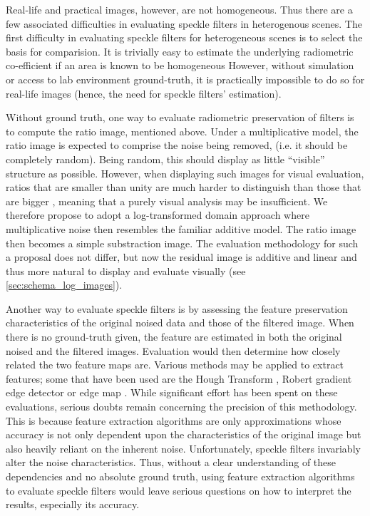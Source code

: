 \documentclass[journal]{IEEEtran}
\begin{document}
Real-life and practical images, however, are not homogeneous.
Thus there are a few associated difficulties in evaluating speckle filters in heterogenous scenes.
The first difficulty in evaluating speckle filters for heterogeneous scenes is to select the basis for comparision. 
It is trivially easy to estimate the underlying radiometric co-efficient if an area is known to be homogeneous
However, without simulation or access to lab environment ground-truth, it is practically impossible to do so for real-life images (hence, the need for speckle filters' estimation).

Without ground truth, one way to evaluate radiometric preservation of filters is to compute the ratio image, mentioned above. 
Under a multiplicative model, the ratio image is expected to comprise the noise being removed, (i.e. it should be completely random). 
Being random, this should display as little ``visible'' structure as possible. 
However, when displaying such images for visual evaluation, ratios that are smaller than unity are much harder to distinguish than those that are bigger \cite{Medeiros_2003_IJRS}, meaning that a purely visual analysis may be insufficient.
We therefore propose to adopt a log-transformed domain approach where multiplicative noise then resembles the familiar additive model.
The ratio image then becomes a simple substraction image.
The evaluation methodology for such a proposal does not differ, but now the residual image is additive and linear and thus more natural to display and evaluate visually (see \ref{sec:schema_log_images}).

Another way to evaluate speckle filters is by assessing the feature preservation characteristics of the original noised data and those of the filtered image. 
When there is no ground-truth given, the feature are estimated in both the original noised and the filtered images.
Evaluation would then determine how closely related the two feature maps are. 
Various methods may be applied to extract features; some that have been used are the Hough Transform \cite{Medeiros_2003_IJRS}, Robert gradient edge detector \cite{Gagnon_SPIEProc_1997} or edge map \cite{Frost_PAMI_1982}.
While significant effort has been spent on these evaluations, serious doubts remain concerning the precision of this methodology.
This is because feature extraction algorithms are only approximations 
	whose accuracy is 
		not only dependent upon the characteristics of the original image 
		but also heavily reliant on the inherent noise.
Unfortunately, speckle filters invariably alter the noise characteristics.
Thus, without a clear understanding of these dependencies and no absolute ground truth, 
	using feature extraction algorithms to evaluate speckle filters would leave serious questions on how to interpret the results, especially its accuracy.
\end{document}
